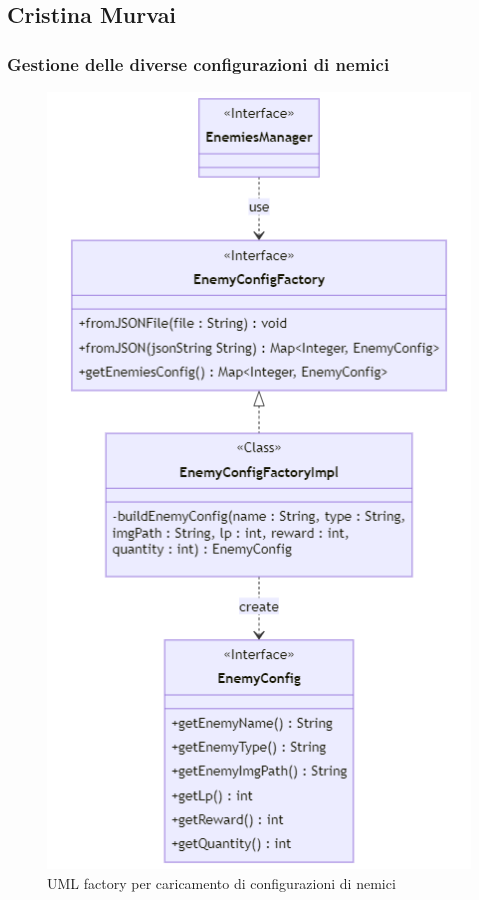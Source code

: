 \documentclass[a4paper,12pt]{report}
\begin{document}
\newpage
\subsection{Cristina Murvai}
\subsubsection{Gestione delle diverse configurazioni di nemici}
\begin{figure}[H]
    \centering
    \includegraphics[scale=0.8]{RelazioneTD/images/enemyConfigFactoryUML.png}
    \caption{UML factory per caricamento di configurazioni di nemici}
    \label{fig:enter-label}
\end{figure}
\end{document}
